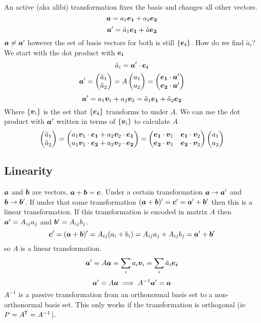 \documentclass{article}
\begin{document}
    An active (aka alibi) transformation fixes the basis and changes all other vectors.
    \[\bm{a} = a_1\bm{e_{1}} + a_2\bm{e_{2}}\]
    \[\bm{a}' = \tilde{a}_1\bm{e_{1}} + \tilde{a}\bm{e_{2}}\]
    \(\bm{a}\ne\bm{a}'\) however the set of basis vectors for both is still \(\{\bm{e_{i}}\}\).
    How do we find \(\tilde{a}_i\)? We start with the dot product with \(\bm{e_{i}}\)
    \[\tilde{a}_i = \bm{a}'\cdot \bm{e_{i}}\]
    \[
        \bm{a}' = 
        \begin{pmatrix}
            \tilde{a}_1 \\ \tilde{a}_2
        \end{pmatrix}
        = A
        \begin{pmatrix}
            a_1 \\ a_2
        \end{pmatrix}
        =
        \begin{pmatrix}
            \bm{e_{1}}\cdot \bm{a}'\\
            \bm{e_{2}}\cdot \bm{a}'
        \end{pmatrix}
    \]
    \[\bm{a}' = a_1\bm{v}_1 + a_2\bm{v}_2 = \tilde{a}_1\bm{e_{1}} + \tilde{a}_2\bm{e_{2}}\]
    Where \(\{\bm{v}_i\}\) is the set that \(\{\bm{e_{i}}\}\) transforms to under \(A\).
    We can use the dot product with \(\bm{a}'\) written in terms of \(\{\bm{v}_i\}\) to calculate \(A\)
    \[
        \begin{pmatrix}
            \tilde{a}_1 \\ \tilde{a}_2
        \end{pmatrix}
        =
        \begin{pmatrix}
            a_1\bm{v}_1\cdot\bm{e_{1}} + a_2\bm{v}_2\cdot\bm{e_{1}}\\
            a_1\bm{v}_1\cdot\bm{e_{2}} + a_2\bm{v}_2\cdot\bm{e_{2}}
        \end{pmatrix}
        =
        \begin{pmatrix}
            \bm{e_{1}}\cdot \bm{v}_1 & \bm{e_{1}}\cdot\bm{v}_2\\
            \bm{e_{2}}\cdot \bm{v}_1 & \bm{e_{2}}\cdot\bm{v}_2
        \end{pmatrix}
        \begin{pmatrix}
            a_1 \\ a_2
        \end{pmatrix}
    \]
    \subsection{Linearity}
    \(\bm{a}\) and \(\bm{b}\) are vectors, \(\bm{a} + \bm{b} = \bm{c}\). 
    Under a certain transformation \(\bm{a}\to \bm{a}'\) and \(\bm{b}\to \bm{b}'\).
    If under that same transformation \((\bm{a} + \bm{b})' = \bm{c}' = \bm{a}' + \bm{b}'\) then this is a linear transformation.
    If this transformation is encoded in matrix \(A\) then \(\bm{a}' = A_{ij}a_j\) and \(\bm{b}' = A_{ij}b_j\).
    \[\bm{c}' = (\bm{a} + \bm{b})' = A_{ij}(a_i + b_i) = A_{ij}a_j + A_{ij}b_j = \bm{a}' + \bm{b}'\]
    so \(A\) is a linear transformation.
    \[\bm{a}' = A\bm{a} = \sum_{i} a_i\bm{v}_i = \sum_i \tilde{a}_i\bm{e_{i}}\]
    \[\bm{a}' = A\bm{a}\implies A^{-1}\bm{a}' = \bm{a}\]
    \(A^{-1}\) is a passive transformation from an orthonormal basis set to a non-orthonormal basis set. This only works if the transformation is orthogonal (ie \(P = A^{\mkern-1.5mu\mathsf{T}} = A^{-1}\)).
    
\end{document}
